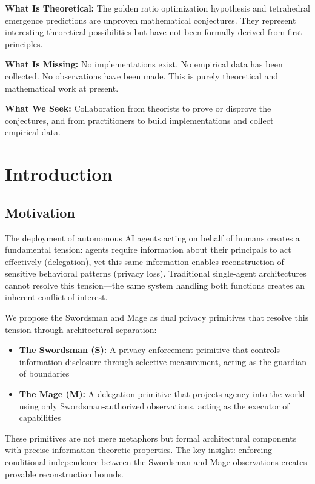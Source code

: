 \documentclass[11pt,a4paper]{article}
\theoremstyle{definition}
\begin{document}
\textbf{What Is Theoretical:} The golden ratio optimization hypothesis and tetrahedral emergence predictions are unproven mathematical conjectures. They represent interesting theoretical possibilities but have not been formally derived from first principles.

\textbf{What Is Missing:} No implementations exist. No empirical data has been collected. No observations have been made. This is purely theoretical and mathematical work at present.

\textbf{What We Seek:} Collaboration from theorists to prove or disprove the conjectures, and from practitioners to build implementations and collect empirical data.

\section{Introduction}

\subsection{Motivation}

The deployment of autonomous AI agents acting on behalf of humans creates a fundamental tension: agents require information about their principals to act effectively (delegation), yet this same information enables reconstruction of sensitive behavioral patterns (privacy loss). Traditional single-agent architectures cannot resolve this tension---the same system handling both functions creates an inherent conflict of interest.

We propose the Swordsman and Mage as dual privacy primitives that resolve this tension through architectural separation:

\begin{itemize}
    \item \textbf{The Swordsman (S):} A privacy-enforcement primitive that controls information disclosure through selective measurement, acting as the guardian of boundaries
    \item \textbf{The Mage (M):} A delegation primitive that projects agency into the world using only Swordsman-authorized observations, acting as the executor of capabilities
\end{itemize}

These primitives are not mere metaphors but formal architectural components with precise information-theoretic properties. The key insight: enforcing conditional independence between the Swordsman and Mage observations creates provable reconstruction bounds.
\end{document}
